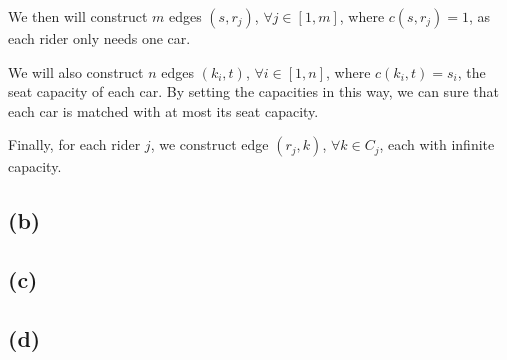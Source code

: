 \documentclass{6046}
\begin{document}
We then will construct $m$ edges $(s, r_j)$, $\forall j \in [1, m]$,
where $c(s, r_j) = 1$, as each rider only needs one car.

We will also construct $n$ edges $(k_i, t)$, $\forall i \in [1, n]$,
where $c(k_i, t) = s_i$, the seat capacity of each car. By setting
the capacities in this way, we can sure that each car is matched with
at most its seat capacity.

Finally, for each rider $j$, we construct edge $(r_j, k)$, $\forall k \in C_j$,
each with infinite capacity. 

\subsection*{(b)}

\subsection*{(c)}

\subsection*{(d)}
\end{document}
